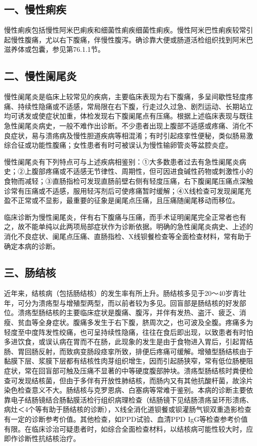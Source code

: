 \subsection{一、慢性痢疾}

慢性痢疾包括慢性阿米巴痢疾和细菌性痢疾细菌性痢疾。慢性阿米巴性痢疾较常引起慢性腹痛，尤以右下腹痛，伴慢性腹泻。确诊靠大便或肠道活检组织找到阿米巴滋养体或包囊，参见第76.1.1节。

\subsection{二、慢性阑尾炎}

慢性阑尾炎是临床上较常见的疾病，主要临床表现为右下腹痛，多呈间歇性轻度疼痛、持续性隐痛或不适感，常局限在右下腹，行走过久过急、剧烈运动、长期站立均可诱发或使症状加重，体检发现右下腹阑尾点有压痛。根据上述临床表现与既往急性阑尾炎病史，一般不难作出诊断。不少患者出现上腹部不适感或疼痛、消化不良症状，易与溃疡病及慢性胆道疾病等相混淆；有时引起痉挛性便秘，类似肠易激综合征或功能性腹痛；女性患者有时可被误认为慢性输卵管炎等盆腔炎症。

慢性阑尾炎有下列特点可与上述疾病相鉴别：①大多数患者过去有急性阑尾炎病史；②上腹部疼痛或不适感无节律性、周期性，但可因进食碱性药物或刺激性小的食物而减轻；③直肠指检可发现直肠前壁右侧有轻度压痛，右下腹阑尾压痛点深触诊常有压痛或不适感，服用轻泻剂后可使疼痛暂时缓解；④X线检查可发现阑尾充盈不正常或不显影，最重要的征象是阑尾点压痛，且压痛随阑尾移动而移位。

临床诊断为慢性阑尾炎，伴有右下腹痛与压痛，而手术证明阑尾完全正常者也有之，故不能单纯以此两项局部症状作为诊断依据。明确的急性阑尾炎病史、上述的消化不良症状、阑尾点压痛、直肠指检、X线钡餐检查等全面检查材料，常有助于确定本病的诊断。

\subsection{三、肠结核}

近年来，结核病（包括肠结核）的发生率有所上升。肠结核多见于20～40岁青壮年，可分为溃疡型与增殖型两型，而以前者较为多见。回盲部是肠结核的好发部位。溃疡型肠结核的主要临床症状是腹痛、腹泻，并伴有发热、盗汗、疲乏、消瘦、贫血等全身症状。腹痛多发生于右下腹，脐周次之，也可波及全腹。疼痛多为轻度至中度阵发性绞痛，也可呈持续性隐痛，往往在食后即出现，以致患者有时怕多进饮食，或误认病在胃而不在肠，此现象的发生是由于食物进入胃后，引起胃结肠、胃回肠反射，而致病变肠段痉挛所致，排便后疼痛可缓解。增殖型肠结核由于黏膜下层、浆膜下层都有结核性肉芽组织增生，因而引起肠狭窄，常有低位肠梗阻症状，常在回盲部可触及压痛不显著的中等硬度腹部肿块。溃疡型肠结核时粪便检查可发现结核菌，但由于多伴有开放性肺结核，而肠内又有其他抗酸杆菌，故涂片染色检查意义不大。肠结核与克罗恩病、白塞病等常难于鉴别。本病的诊断主要依靠电子结肠镜结合肠黏膜活检行组织病理检查（结肠镜下见结肠溃疡呈环形溃疡、病灶＜4个等有助于肠结核的诊断），X线全消化道钡餐或钡灌肠气钡双重造影检查有一定的诊断参考价值。其他检查，如PPD试验、血清PPD
IgG等检查参考价值有限。在临床诊治可疑患者时，如综合全面检查材料，以结核病可能性较大时，应即作诊断性抗结核治疗。

